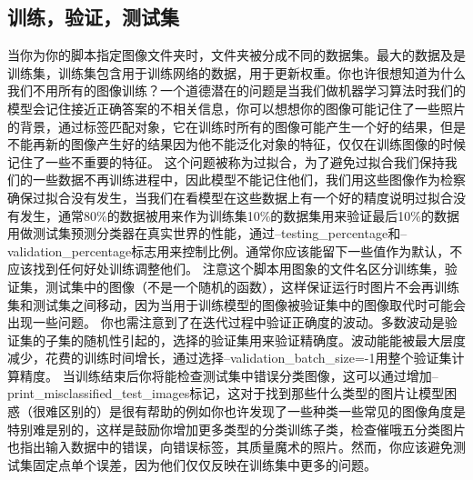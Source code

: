 \subsection{训练，验证，测试集}
当你为你的脚本指定图像文件夹时，文件夹被分成不同的数据集。最大的数据及是训练集，训练集包含用于训练网络的数据，用于更新权重。你也许很想知道为什么我们不用所有的图像训练？一个道德潜在的问题是当我们做机器学习算法时我们的模型会记住接近正确答案的不相关信息，你可以想想你的图像可能记住了一些照片的背景，通过标签匹配对象，它在训练时所有的图像可能产生一个好的结果，但是不能再新的图像产生好的结果因为他不能泛化对象的特征，仅仅在训练图像的时候记住了一些不重要的特征。
这个问题被称为过拟合，为了避免过拟合我们保持我们的一些数据不再训练进程中，因此模型不能记住他们，我们用这些图像作为检察确保过拟合没有发生，当我们在看模型在这些数据上有一个好的精度说明过拟合没有发生，通常80\%的数据被用来作为训练集10\%的数据集用来验证最后10\%的数据用做测试集预测分类器在真实世界的性能，通过--testing\_percentage和--validation\_percentage标志用来控制比例。通常你应该能留下一些值作为默认，不应该找到任何好处训练调整他们。
注意这个脚本用图象的文件名区分训练集，验证集，测试集中的图像（不是一个随机的函数），这样保证运行时图片不会再训练集和测试集之间移动，因为当用于训练模型的图像被验证集中的图像取代时可能会出现一些问题。
你也需注意到了在迭代过程中验证正确度的波动。多数波动是验证集的子集的随机性引起的，选择的验证集用来验证精确度。波动能能被最大层度减少，花费的训练时间增长，通过选择--validation\_batch\_size=-1用整个验证集计算精度。
当训练结束后你将能检查测试集中错误分类图像，这可以通过增加--print\_misclassified\_test\_images标记，这对于找到那些什么类型的图片让模型困惑（很难区别的）是很有帮助的例如你也许发现了一些种类一些常见的图像角度是特别难是别的，这样是鼓励你增加更多类型的分类训练子类，检查催哦五分类图片也指出输入数据中的错误，向错误标签，其质量魔术的照片。然而，你应该避免测试集固定点单个误差，因为他们仅仅反映在训练集中更多的问题。
